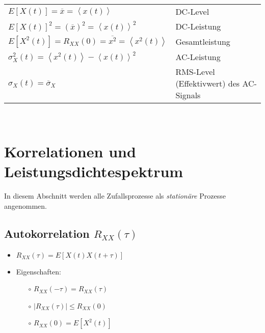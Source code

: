 \documentclass[10pt, a4paper]{article}
\begin{document}
\begin{itemize}
\begin{tabular}{ll}
          $E[X(t)] = \overline{x} = \left\langle x(t) \right\rangle$ & DC-Level \\
          $E[X(t)]^{2} = (\overline{x})^{2} = \left\langle x(t) \right\rangle^{2}$ & DC-Leistung \\
          $E[X^{2}(t)] = R_{XX}(0) = \overline{x^{2}} = 
                         \left\langle x^{2}(t) \right\rangle $ & Gesamtleistung \\
          $\sigma_{X}^{2}(t) = \left\langle x^{2}(t) \right\rangle 
                               - \left\langle x(t) \right\rangle^{2}$ & AC-Leistung \\
          $\sigma_{X}(t) = \overline{\sigma}_{X}$ & RMS-Level (Effektivwert) des AC-Signals\\
        \end{tabular} \\
\end{itemize} 
\clearpage

\section{Korrelationen und Leistungsdichtespektrum}
In diesem Abschnitt werden alle Zufallsprozesse als \textit{station\"are} Prozesse angenommen.

\subsection{Autokorrelation $R_{XX}(\tau)$}
\begin{itemize}
  \item $R_{XX}(\tau) = E[X(t)X(t+\tau)]$
  \item Eigenschaften:
  \begin{itemize}
     \item[$\circ$] $R_{XX}(-\tau) = R_{XX}(\tau)$  
     \item[$\circ$] $\mid \! R_{XX}(\tau) \! \mid \leq R_{XX}(0)$  
     \item[$\circ$] $R_{XX}(0) = E[X^{2}(t)]$  
  \end{itemize} 
\end{itemize} 
\end{document}
